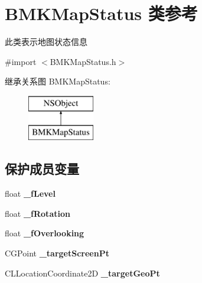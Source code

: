 \hypertarget{interface_b_m_k_map_status}{\section{B\-M\-K\-Map\-Status 类参考}
\label{interface_b_m_k_map_status}
}


此类表示地图状态信息  




{\ttfamily \#import $<$B\-M\-K\-Map\-Status.\-h$>$}

继承关系图 B\-M\-K\-Map\-Status\-:\begin{figure}[H]
\begin{center}
\leavevmode
\includegraphics[height=2.000000cm]{interface_b_m_k_map_status}
\end{center}
\end{figure}
\subsection*{保护成员变量}
\begin{DoxyCompactItemize}
\item 
\hypertarget{interface_b_m_k_map_status_a0c67450ec78dc6be5e87fed6aa3ade92}{float {\bfseries \-\_\-f\-Level}}\label{interface_b_m_k_map_status_a0c67450ec78dc6be5e87fed6aa3ade92}

\item 
\hypertarget{interface_b_m_k_map_status_a04fb6a2f91634c82423dcd9bf07efa12}{float {\bfseries \-\_\-f\-Rotation}}\label{interface_b_m_k_map_status_a04fb6a2f91634c82423dcd9bf07efa12}

\item 
\hypertarget{interface_b_m_k_map_status_a3a4fb7039f93b796646d161e4e87ae77}{float {\bfseries \-\_\-f\-Overlooking}}\label{interface_b_m_k_map_status_a3a4fb7039f93b796646d161e4e87ae77}

\item 
\hypertarget{interface_b_m_k_map_status_aa440aec20efe8874977fa9fc18d71604}{C\-G\-Point {\bfseries \-\_\-target\-Screen\-Pt}}\label{interface_b_m_k_map_status_aa440aec20efe8874977fa9fc18d71604}

\item 
\hypertarget{interface_b_m_k_map_status_adca8672a6bea448a9eadcaf65df7eae2}{C\-L\-Location\-Coordinate2\-D {\bfseries \-\_\-target\-Geo\-Pt}}\label{interface_b_m_k_map_status_adca8672a6bea448a9eadcaf65df7eae2}

\end{DoxyCompactItemize}
